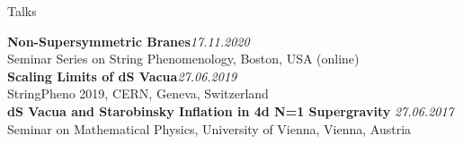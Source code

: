 \documentclass[a4paper]{resume} %
\begin{document}

\begin{rSection}{Talks}

{\bf Non-Supersymmetric Branes}\hfill{\em 17.11.2020}
\\ Seminar Series on String Phenomenology, Boston, USA (online)\vspace{7pt}
\\{\bf Scaling Limits of dS Vacua}\hfill{\em 27.06.2019}
\\ StringPheno 2019, CERN, Geneva, Switzerland\vspace{7pt}
\\{\bf dS Vacua and Starobinsky Inflation in 4d N=1 Supergravity} \hfill {\em 27.06.2017}
\\ Seminar on Mathematical Physics, University of Vienna, Vienna, Austria

\end{rSection}

\end{document}
